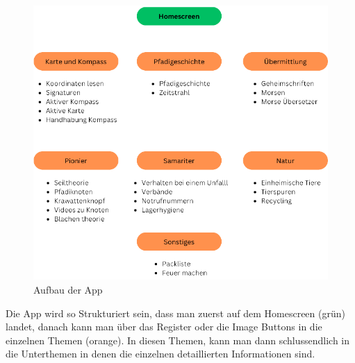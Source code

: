 \begin{center}
\begin{figure}[h]
    \includegraphics[width=1\linewidth]{Picture/appstruktur.png}
    \caption{Aufbau der App}
\end{figure}
\end{center}
Die App wird so Strukturiert sein, dass man zuerst auf dem Homescreen (grün) landet, danach kann man über das Register oder die Image Buttons in die einzelnen Themen (orange). In diesen Themen, kann man dann schlussendlich in die Unterthemen in denen die einzelnen detaillierten Informationen sind.